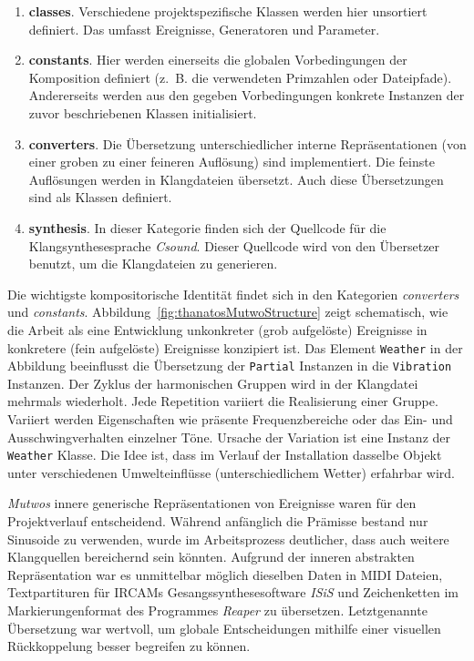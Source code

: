 \documentclass[12pt,a4paper,ngerman]{article}
\begin{document}
\begin{enumerate}
    \item{%
        \textbf{classes}.
        Verschiedene projektspezifische Klassen werden hier unsortiert definiert.
        Das umfasst Ereignisse, Generatoren und Parameter.
    }

    \item{%
        \textbf{constants}.
        Hier werden einerseits die globalen Vorbedingungen der Komposition definiert (z.~B. die verwendeten Primzahlen oder Dateipfade).
        Andererseits werden aus den gegeben Vorbedingungen konkrete Instanzen der zuvor beschriebenen Klassen initialisiert.
    }

    \item{%
        \textbf{converters}.
        Die Übersetzung unterschiedlicher interne Repräsentationen (von einer groben zu einer feineren Auflösung) sind implementiert.
        Die feinste Auflösungen werden in Klangdateien übersetzt.
        Auch diese Übersetzungen sind als Klassen definiert.
    }

    \item{%
        \textbf{synthesis}.
        In dieser Kategorie finden sich der Quellcode für die Klangsynthesesprache \emph{Csound}.
        Dieser Quellcode wird von den Übersetzer benutzt, um die Klangdateien zu generieren.
    }
\end{enumerate}

Die wichtigste kompositorische Identität findet sich in den Kategorien \emph{converters} und \emph{constants}.
Abbildung~\ref{fig:thanatosMutwoStructure} zeigt schematisch, wie die Arbeit als eine Entwicklung unkonkreter (grob aufgelöste) Ereignisse in konkretere (fein aufgelöste) Ereignisse konzipiert ist.
Das Element \texttt{Weather} in der Abbildung beeinflusst die Übersetzung der \texttt{Partial} Instanzen in die \texttt{Vibration} Instanzen.
Der Zyklus der harmonischen Gruppen wird in der Klangdatei mehrmals wiederholt.
Jede Repetition variiert die Realisierung einer Gruppe.
Variiert werden Eigenschaften wie präsente Frequenzbereiche oder das Ein- und Ausschwingverhalten einzelner Töne.
Ursache der Variation ist eine Instanz der \texttt{Weather} Klasse.
Die Idee ist, dass im Verlauf der Installation dasselbe Objekt unter verschiedenen Umwelteinflüsse (unterschiedlichem Wetter) erfahrbar wird.

\bigskip

\emph{Mutwos} innere generische Repräsentationen von Ereignisse waren für den Projektverlauf entscheidend.
Während anfänglich die Prämisse bestand nur Sinusoide zu verwenden, wurde im Arbeitsprozess deutlicher, dass auch weitere Klangquellen bereichernd sein könnten.
Aufgrund der inneren abstrakten Repräsentation war es unmittelbar möglich dieselben Daten in MIDI Dateien, Textpartituren für IRCAMs Gesangssynthesesoftware \emph{ISiS} und Zeichenketten im Markierungenformat des Programmes \emph{Reaper} zu übersetzen.
Letztgenannte Übersetzung war wertvoll, um globale Entscheidungen mithilfe einer visuellen Rückkoppelung besser begreifen zu können.
\end{document}

